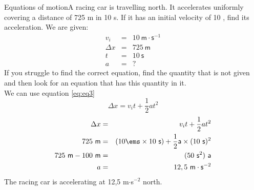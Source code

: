 \begin{wex}{Equations of motion}{A racing car is travelling north. It accelerates uniformly  covering a distance of 725 m in 10 s. If it has an initial velocity of 10 \ms, find its acceleration.}
{ We are given:
\begin{eqnarray*}
v_i&=&10\ \mathsf{m} \cdot \mathsf{s}^{-1}\\
\Delta x&=&725\ \mathsf{m}\\
t&=&10\ \mathsf{s}\\
a&=&?
\end{eqnarray*}
If you struggle to find the correct equation, find the quantity that is not given and then look for an equation that has this quantity in it.\\
We can use equation \ref{eq:eq3}
\begin{displaymath}
\Delta x=v_it +\frac{1}{2}at^2
\end{displaymath}
\begin{eqnarray*}
\Delta x &=& v_it +\frac{1}{2}at^2\\
725\mathsf{~m} &=& (10\ems \times 10\mathsf{~s}) + \frac{1}{2} \mathsf{a} \times (10\mathsf{~s})^2\\
725\mathsf{~m} - 100\mathsf{~m} &=& (50\mathsf{~s}^2)~ \mathsf{a}\\
a &=& 12,5~ \mathsf{m} \cdot\mathsf{s}^{-2}
\end{eqnarray*}
The racing car is accelerating at 12,5 m$\cdot$s$^{-2}$ north.}
\end{wex}
    \noindent
\label{m38796*secfhsst!!!underscore!!!id5126}\vspace{.5cm} 
      \noindent
